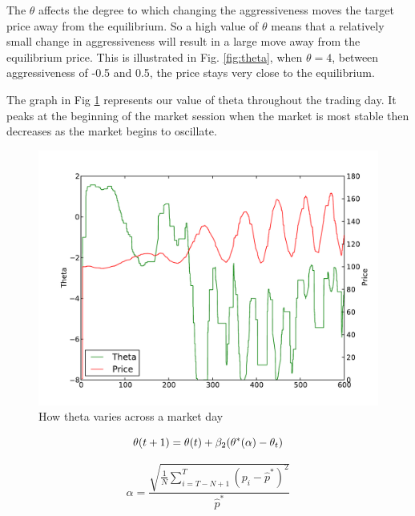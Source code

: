 \documentclass[preprint]{acm_proc_article-sp} %
\begin{document}
The $\theta$ affects the degree to which changing the aggressiveness moves the
target price  away from the equilibrium. So a high value of $\theta$ means that a
relatively small change in aggressiveness will result in a large move away from
the equilibrium price. This is illustrated in Fig. \ref{fig:theta}, when
$\theta=4$, between aggressiveness of -0.5 and 0.5, the price stays very close
to the equilibrium.

The graph in Fig \ref{fig:theta_v_time} represents our value of theta
throughout the trading day. It peaks at the beginning of the market session
when the market is most stable then decreases as the market begins to
oscillate.

\begin{figure}
  \centering
  \includegraphics[width=\columnwidth]{graphs_and_stats/graph_theta_vs_time.pdf}
  \caption{How theta varies across a market day}
  \label{fig:theta_v_time}
\end{figure}


\begin{equation}
  \theta(t+1)=\theta(t)+\beta_2(\theta^*(\alpha)-\theta_t)\\\\
  \label{eqn:update_theta}
\end{equation}

\begin{equation}
  \alpha = \frac{\sqrt{\frac 1 N \sum^T_{i=T-N+1}(p_i-\hat p^*)^2}}{\hat p^*}
  \label{eqn:alpha}
\end{equation}
\end{document}
